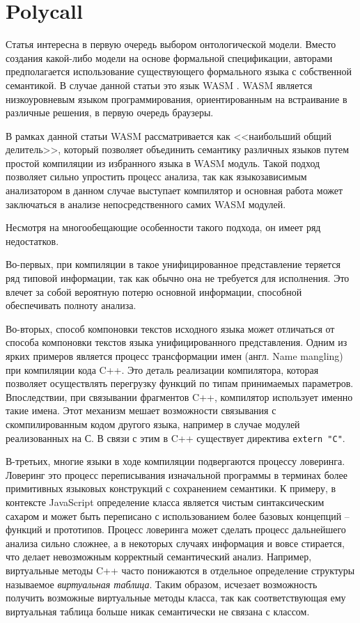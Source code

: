 \section{Polycall} \label{ssec:polycall}

Статья \cite{polycall} интересна в первую очередь выбором онтологической модели. Вместо создания 
какой-либо модели на основе формальной спецификации, авторами предполагается использование
существующего формального языка с собственной семантикой. В случае данной статьи это язык WASM \cite{wasm}.
WASM является низкоуровневым языком программирования, ориентированным на встраивание в различные решения, в первую очередь 
браузеры.

В рамках данной статьи WASM рассматривается как <<наибольший общий делитель>>, который позволяет объединить
семантику различных языков путем простой компиляции из избранного языка в WASM модуль. Такой подход позволяет
сильно упростить процесс анализа, так как языкозависимым анализатором в данном случае выступает компилятор и
основная работа может заключаться в анализе непосредственного самих WASM модулей.

Несмотря на многообещающие особенности такого подхода, он имеет ряд недостатков. 

Во-первых, при компиляции в такое унифицированное представление теряется ряд типовой информации, так как обычно она не требуется для исполнения.
Это влечет за собой вероятную потерю основной информации, способной обеспечивать полноту анализа. 

Во-вторых, способ компоновки текстов исходного языка может отличаться от способа компоновки текстов языка унифицированного представления.
Одним из ярких примеров является процесс трансформации имен (англ. Name mangling) при компиляции кода C++. Это деталь реализации
компилятора, которая позволяет осуществлять перегрузку функций по типам принимаемых параметров. Впоследствии, при связывании
фрагментов C++, компилятор использует именно такие имена. Этот механизм мешает возможности связывания с скомпилированным кодом
другого языка, например в случае модулей реализованных на С. В связи с этим в C++ существует директива \texttt{extern "C"}.

В-третьих, многие языки в ходе компиляции подвергаются процессу ловеринга. Ловеринг это процесс переписывания изначальной программы
в терминах более примитивных языковых конструкций с сохранением семантики. К примеру, в контексте JavaScript определение
класса является чистым синтаксическим сахаром и может быть переписано с использованием более базовых концепций -- функций и прототипов.
Процесс ловеринга может сделать процесс дальнейшего анализа сильно сложнее, а в некоторых случаях информация и вовсе стирается, что
делает невозможным корректный семантический анализ. Например, виртуальные методы C++ часто понижаются в отдельное определение
структуры называемое \textit{виртуальная таблица}. Таким образом, исчезает возможность получить возможные виртуальные методы
класса, так как соответствующая ему виртуальная таблица больше никак семантически не связана с классом.

